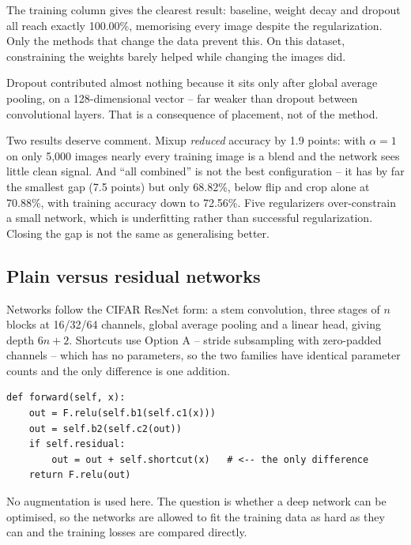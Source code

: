 \documentclass[11pt,a4paper]{article}
\begin{document}
The training column gives the clearest result: baseline, weight decay and
dropout all reach exactly 100.00\%, memorising every image despite the
regularization. Only the methods that change the data prevent this. On this
dataset, constraining the weights barely helped while changing the images did.

Dropout contributed almost nothing because it sits only after global average
pooling, on a 128-dimensional vector -- far weaker than dropout between
convolutional layers. That is a consequence of placement, not of the method.

Two results deserve comment. Mixup \emph{reduced} accuracy by 1.9 points: with
$\alpha = 1$ on only 5{,}000 images nearly every training image is a blend and
the network sees little clean signal. And ``all combined'' is not the best
configuration -- it has by far the smallest gap (7.5 points) but only 68.82\%,
below flip and crop alone at 70.88\%, with training accuracy down to 72.56\%.
Five regularizers over-constrain a small network, which is underfitting rather
than successful regularization. Closing the gap is not the same as generalising
better.

\subsection{Plain versus residual networks}

Networks follow the CIFAR ResNet form: a stem convolution, three stages of $n$
blocks at 16/32/64 channels, global average pooling and a linear head, giving
depth $6n+2$. Shortcuts use Option A -- stride subsampling with zero-padded
channels -- which has no parameters, so the two families have identical
parameter counts and the only difference is one addition.

\begin{lstlisting}[caption={The only difference between the two families.}]
def forward(self, x):
    out = F.relu(self.b1(self.c1(x)))
    out = self.b2(self.c2(out))
    if self.residual:
        out = out + self.shortcut(x)   # <-- the only difference
    return F.relu(out)
\end{lstlisting}

No augmentation is used here. The question is whether a deep network can be
optimised, so the networks are allowed to fit the training data as hard as they
can and the training losses are compared directly.
\end{document}
